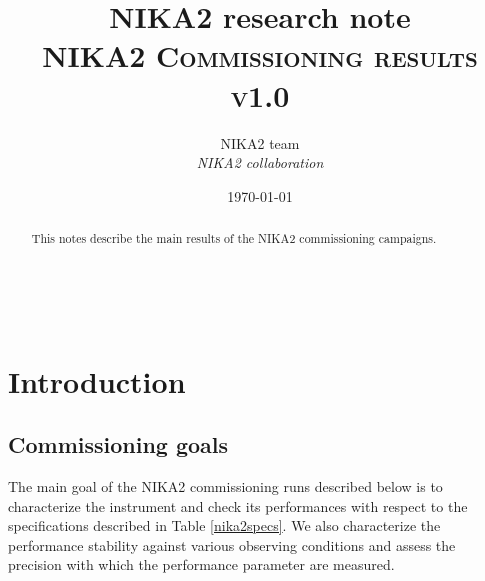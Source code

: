 \documentclass[a4paper, 11pt]{article} %
\title{\textbf{NIKA2 research note}\\   
\textsc{NIKA2 Commissioning results v1.0}} %
\author{NIKA2 team %
\\{\textit{NIKA2 collaboration}}} %
\date{\today} %
\makeatletter
\renewcommand{\maketitle}{ %
\begin{flushleft} %
{\LARGE\@title} %

\vspace{50pt} %

{\large\@author} %
\\\@date %

\vspace{40pt} %
\end{flushleft}
}
\makeatother
\begin{document}
\maketitle %
\tableofcontents


\begin{abstract}
This notes describe the main results of the NIKA2 commissioning campaigns.
\end{abstract}


\vspace{30pt} %

%
%


\section{Introduction}

\subsection{Commissioning goals}
The main goal of the NIKA2 commissioning runs described below is to characterize the instrument and check its performances with respect to the specifications described in Table \ref{nika2specs}. We also characterize the performance stability against various observing conditions and assess the precision with which the performance parameter are measured.
\end{document}
